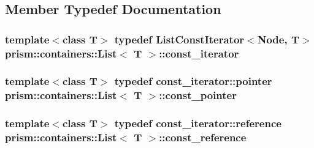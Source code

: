 \subsection{Member Typedef Documentation}
\subsubsection[{\texorpdfstring{const\+\_\+iterator}{const_iterator}}]{\setlength{\rightskip}{0pt plus 5cm}template$<$class T$>$ typedef List\+Const\+Iterator$<$Node, T$>$ {\bf prism\+::containers\+::\+List}$<$ T $>$\+::{\bf const\+\_\+iterator}}\hypertarget{classprism_1_1containers_1_1_list_ab7a3833614e0dbdcc666829f86efa5e2}{}\label{classprism_1_1containers_1_1_list_ab7a3833614e0dbdcc666829f86efa5e2}
\subsubsection[{\texorpdfstring{const\+\_\+pointer}{const_pointer}}]{\setlength{\rightskip}{0pt plus 5cm}template$<$class T$>$ typedef const\+\_\+iterator\+::pointer {\bf prism\+::containers\+::\+List}$<$ T $>$\+::{\bf const\+\_\+pointer}}\hypertarget{classprism_1_1containers_1_1_list_a9d28e5cd275b4bb9afe1f5b3ddb90fed}{}\label{classprism_1_1containers_1_1_list_a9d28e5cd275b4bb9afe1f5b3ddb90fed}
\subsubsection[{\texorpdfstring{const\+\_\+reference}{const_reference}}]{\setlength{\rightskip}{0pt plus 5cm}template$<$class T$>$ typedef const\+\_\+iterator\+::reference {\bf prism\+::containers\+::\+List}$<$ T $>$\+::{\bf const\+\_\+reference}}\hypertarget{classprism_1_1containers_1_1_list_a7c1ae893be7215e14e183c0e3652e1b5}{}\label{classprism_1_1containers_1_1_list_a7c1ae893be7215e14e183c0e3652e1b5}
